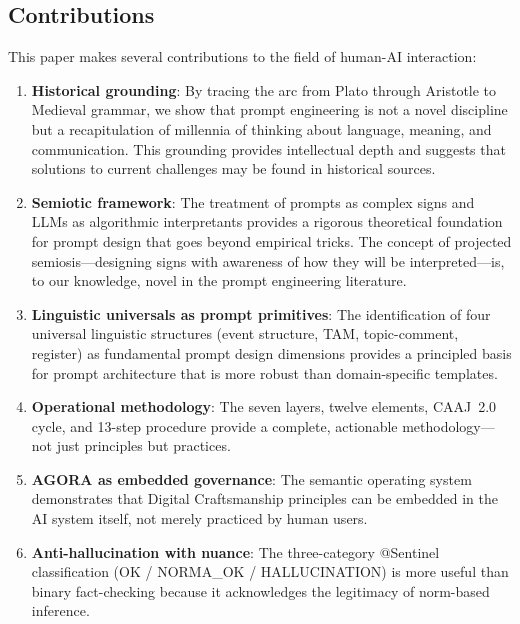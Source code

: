 \documentclass[11pt,a4paper]{article}
\begin{document}
\subsection{Contributions}

This paper makes several contributions to the field of human-AI interaction:

\begin{enumerate}
    \item \textbf{Historical grounding}: By tracing the arc from Plato through Aristotle to Medieval grammar, we show that prompt engineering is not a novel discipline but a recapitulation of millennia of thinking about language, meaning, and communication. This grounding provides intellectual depth and suggests that solutions to current challenges may be found in historical sources.

    \item \textbf{Semiotic framework}: The treatment of prompts as complex signs and LLMs as algorithmic interpretants provides a rigorous theoretical foundation for prompt design that goes beyond empirical tricks. The concept of projected semiosis---designing signs with awareness of how they will be interpreted---is, to our knowledge, novel in the prompt engineering literature.

    \item \textbf{Linguistic universals as prompt primitives}: The identification of four universal linguistic structures (event structure, TAM, topic-comment, register) as fundamental prompt design dimensions provides a principled basis for prompt architecture that is more robust than domain-specific templates.

    \item \textbf{Operational methodology}: The seven layers, twelve elements, CAAJ~2.0 cycle, and 13-step procedure provide a complete, actionable methodology---not just principles but practices.

    \item \textbf{AGORA as embedded governance}: The semantic operating system demonstrates that Digital Craftsmanship principles can be embedded in the AI system itself, not merely practiced by human users.

    \item \textbf{Anti-hallucination with nuance}: The three-category @Sentinel classification (OK / NORMA\_OK / HALLUCINATION) is more useful than binary fact-checking because it acknowledges the legitimacy of norm-based inference.
\end{enumerate}
\end{document}

